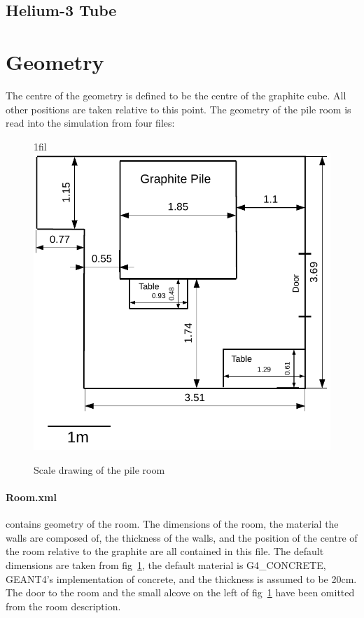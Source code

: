 \documentclass{article}
\makeatletter
\newcommand*{\centerfloat}{%
  \parindent \z@
  \leftskip \z@ \@plus 1fil \@minus \textwidth
  \rightskip\leftskip
  \parfillskip \z@skip}
\makeatother
\begin{document}
\subsection{Helium-3 Tube}



\section{Geometry}

	The centre of the geometry is defined to be the centre of the graphite cube. All other positions are taken relative to this point. The geometry of the pile room is read into the simulation from four files:
\begin{figure}[htb]
	\centerfloat
	\includegraphics[width=\columnwidth]{images/Room}
	\caption{Scale drawing of the pile room}	
	\label{fig:room}
\end{figure}


	\paragraph{Room.xml} contains geometry of the room. The dimensions of the room, the material the walls are composed of, the thickness of the walls, and the position of the centre of the room relative to the graphite are all contained in this file. The default dimensions are taken from fig~\ref{fig:room}, the default 
material is G4\_CONCRETE, GEANT4's implementation of concrete, and the thickness is assumed to be 20cm. The door to the room and the small alcove on the left of fig~\ref{fig:room} have been omitted from the room description.
\end{document}
